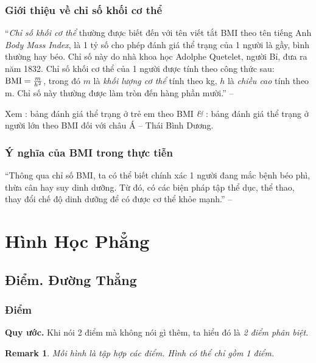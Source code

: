 \documentclass{article}
\numberwithin{equation}{section}
\newtheorem{remark}{Remark}[section]
\begin{document}
\subsubsection{Giới thiệu về chỉ số khối cơ thể}
``\textit{Chỉ số khối cơ thể} thường được biết đến với tên viết tắt BMI theo tên tiếng Anh \textit{Body Mass Index}, là 1 tỷ số cho phép đánh giá thể trạng của 1 người là gầy, bình thường hay béo. Chỉ số này do nhà khoa học Adolphe Quetelet, người Bỉ, đưa ra năm 1832. Chỉ số khối cơ thể của 1 người được tính theo công thức sau: ${\rm BMI} = \frac{m}{h^2}$, trong đó $m$ là \textit{khối lượng cơ thể} tính theo kg, $h$ là \textit{chiều cao} tính theo m. Chỉ số này thường được làm tròn đến hàng phần mười.'' -- \cite[p. 73]{Thai_Anh_Dat_Ha_Loan_Nam_Quang_Toan_6_tap_2}

Xem \cite[Hình 1, p. 73]{Thai_Anh_Dat_Ha_Loan_Nam_Quang_Toan_6_tap_2}: bảng đánh giá thể trạng ở trẻ em theo BMI \textit{\&} \cite[p. 74]{Thai_Anh_Dat_Ha_Loan_Nam_Quang_Toan_6_tap_2}: bảng đánh giá thể trạng ở người lớn theo BMI đối với châu Á -- Thái Bình Dương.

\subsubsection{Ý nghĩa của BMI trong thực tiễn}
``Thông qua chỉ số BMI, ta có thể biết chính xác 1 người đang mắc bệnh béo phì, thừa cân hay suy dinh dưỡng. Từ đó, có các biện pháp tập thể dục, thể thao, thay đổi chế độ dinh dưỡng để có được cơ thể khỏe mạnh.'' -- \cite[p. 74]{Thai_Anh_Dat_Ha_Loan_Nam_Quang_Toan_6_tap_2}


\section{Hình Học Phẳng}

\subsection{Điểm. Đường Thẳng}

\subsubsection{Điểm}
\textbf{Quy ước.} Khi nói 2 điểm mà không nói gì thêm, ta hiểu đó là \textit{2 điểm phân biệt}.

\begin{remark}
	Mỗi hình là tập hợp các điểm. Hình có thể chỉ gồm 1 điểm.
\end{remark}
\end{document}
